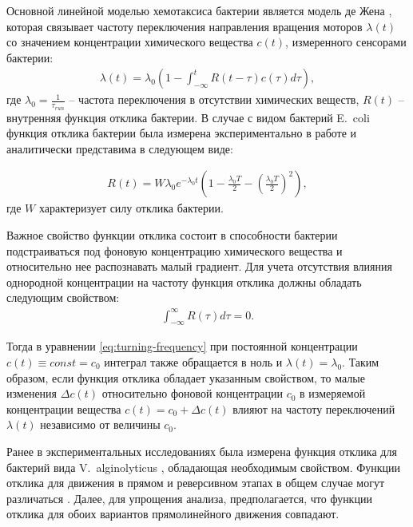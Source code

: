 Основной линейной моделью хемотаксиса бактерии является модель де Жена \cite{de_gennes_chemotaxis_2004}, которая связывает частоту переключения направления вращения моторов $\lambda(t)$ со значением концентрации химического вещества $c(t)$, измеренного сенсорами бактерии:
\begin{equation}
    \begin{aligned}
        \lambda(t)=\lambda_0 \left ( 1 - \int_{-\infty}^t R(t-\tau)c(\tau)d\tau \right ),
    \label{eq:turning-frequency}
    \end{aligned}
\end{equation}
где $\lambda_0=\frac{1}{\tau_{run}}$ -- частота переключения в отсутствии химических веществ, $R(t)$ -- внутренняя функция отклика бактерии. В случае с видом бактерий E.~coli функция отклика бактерии была измерена экспериментально в работе \cite{block_adaptation_1983} и аналитически представима в следующем виде:

\begin{equation}
    \begin{aligned}
        R(t) = W \lambda_0 e^{-\lambda_0t} \left ( 1 - \frac{\lambda_0T}{2} - \left (\frac{\lambda_0T}{2}\right )^2 \right ),
    \label{eq:response-ecoli}
    \end{aligned}
\end{equation}
где $W$ характеризует силу отклика бактерии.  

Важное свойство функции отклика состоит в способности бактерии подстраиваться под фоновую концентрацию химического вещества и относительно нее распознавать малый градиент. Для учета отсутствия влияния однородной концентрации на частоту функция отклика должны обладать следующим свойством:  
\begin{equation}
    \begin{aligned}
        \int_{-\infty}^{\infty} R(\tau)d\tau = 0.
    \label{eq:response-ecoli-zero}
    \end{aligned}
\end{equation}

Тогда в уравнении \cref{eq:turning-frequency} при постоянной концентрации $c(t)\equiv const = c_0$ интеграл также обращается в ноль и $\lambda(t)=\lambda_0$. Таким образом, если функция отклика обладает указанным свойством, то малые изменения $\Delta c(t)$ относительно фоновой концентрации $c_0$ в измеряемой концентрации вещества $c(t)=c_0+\Delta c(t)$ влияют на частоту переключений $\lambda(t)$ независимо от величины $c_0$. 

Ранее в экспериментальных исследованиях была измерена функция отклика для бактерий вида V.~alginolyticus \cite{xie_element_2015}, обладающая необходимым свойством. Функции отклика для движения в прямом и реверсивном этапах в общем случае могут различаться \cite{xie_marine_2015}. Далее, для упрощения анализа, предполагается, что функции отклика для обоих вариантов прямолинейного движения совпадают.

